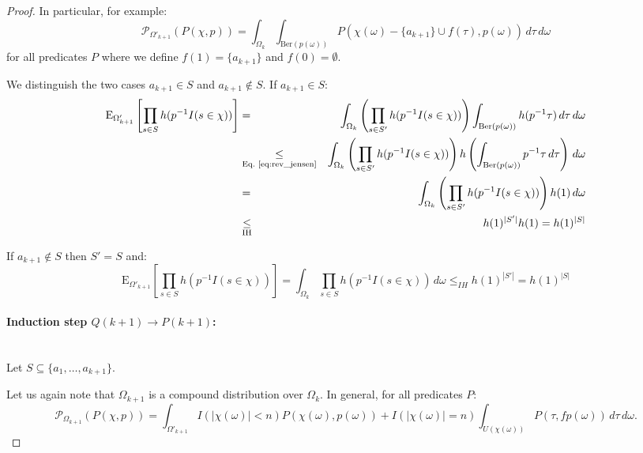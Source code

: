 \documentclass{article}
\newcommand{\prob}{\mathcal P}
\newcommand{\expectation}{\mathrm{E}}
\theoremstyle{definition}
\begin{document}
\begin{proof}
In particular, for example:
\[
\prob_{\Omega'_{k+1}}( P(\chi, p) ) = \int_{\Omega_k} \int_{\textrm{Ber}(p(\omega))} P(\chi(\omega)-\{a_{k+1}\}\cup f(\tau), p(\omega)) \, d \tau \, d \omega
\]
for all predicates $P$ where we define $f(1) = \{a_{k+1}\}$ and $f(0) = \emptyset$.

We distinguish the two cases $a_{k+1} \in S$ and $a_{k+1} \notin S$. If $a_{k+1} \in S$:
\begin{eqnarray*}
  \expectation_{\Omega'_{k+1}}\left[\prod_{s \in S} h(p^{-1} I(s \in \chi)) \right] & = & \int_{\Omega_k} \left(\prod_{s \in S'} h(p^{-1} I(s \in \chi))\right)
  \int_{\mathrm{Ber}(p(\omega))} h(p^{-1} \tau) \, d \tau \, d \omega \\
  & \underset{\textrm{Eq.~\ref{eq:rev_jensen}}}{\leq} & \int_{\Omega_k} \left( \prod_{s \in S'} h(p^{-1} I(s \in \chi)) \right)
  h\left(\int_{\mathrm{Ber}(p(\omega))} p^{-1} \tau \, d \tau\right) \, d \omega \\
  & = & \int_{\Omega_k} \left( \prod_{s \in S'} h(p^{-1} I(s \in \chi)) \right) h(1) \, d \omega \\
  & \underset{\textrm{IH}}{\leq} & h(1)^{|S'|} h(1) = h(1)^{|S|}
\end{eqnarray*}

If $a_{k+1} \notin S$ then $S' = S$ and:
\begin{equation}
  \expectation_{\Omega'_{k+1}}\left[\prod_{s \in S} h(p^{-1} I(s \in \chi)) \right] = \int_{\Omega_k} \prod_{s \in S} h(p^{-1} I(s \in \chi)) \, d \omega \leq_{IH} h(1)^{|S'|} = h(1)^{|S|}
\end{equation}
\paragraph{Induction step $Q(k+1) \rightarrow P(k+1)$:} \phantom{.}\\
Let $S \subseteq \{ a_1, \ldots, a_{k+1} \}$.

Let us again note that $\Omega_{k+1}$ is a compound distribution over $\Omega_k$. In general, for all predicates $P$:
\[
  \prob_{\Omega_{k+1}}( P(\chi, p) )  = \int_{\Omega'_{k+1}} I( |\chi(\omega)|<n ) P(\chi(\omega),p(\omega)) + I( |\chi(\omega)|=n ) \int_{U(\chi(\omega))} P(\tau, f p(\omega)) \, d \tau  \, d \omega \textrm{.}
\]


\end{proof}
\end{document}
